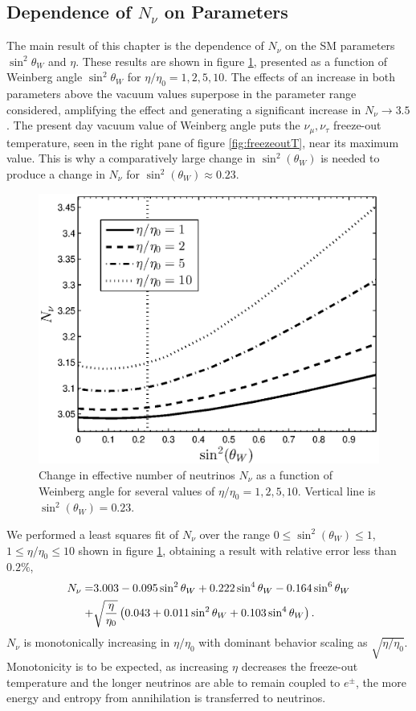 \subsection{Dependence of $N_\nu$ on Parameters}\label{sec:param_char}

The main result  of this chapter is the  dependence of $N_\nu$ on  the SM parameters   $\sin^2\theta_W$ and $\eta$. These results are shown in  figure \ref{N_nu_params}, presented as a function of  Weinberg angle $\sin^2 \theta_W $ for $\eta/\eta_0=1,2,5,10$. The effects of an increase in both parameters above the vacuum values superpose  in the parameter range  considered, amplifying the effect and generating a significant increase in  $N_\nu\to 3.5$. The present day vacuum value of Weinberg angle puts the $\nu_\mu,\nu_\tau$ freeze-out temperature, seen in the right pane of figure \ref{fig:freezeoutT},  near its maximum value.  This is why a comparatively large change in $\sin^2(\theta_W)$ is needed to produce a change in $N_\nu$ for $\sin^2(\theta_W)\approx0.23$.
 
\begin{figure}%
\centerline{\includegraphics[width=0.70\columnwidth]{03-birrell/ParametricStudies/N_eff2.eps}
}
\caption{Change in effective number of neutrinos  $N_\nu$ as a function of Weinberg angle for  several values of $\eta/\eta_0=1,2,5,10$. Vertical line is $\sin^2(\theta_W)=0.23$.}
\label{N_nu_params}  
 \end{figure}
We performed a least squares fit of $N_\nu$ over the range $0\leq \sin^2(\theta_W)\leq 1$, $1\leq \eta/\eta_0\leq 10$ shown in figure \ref{N_nu_params}, obtaining a result with relative error less than $0.2\%$,
\begin{align}
N_\nu=&3.003-0.095\sin^2\theta_W +0.222\sin^4\theta_W  -0.164\sin^6\theta_W \notag\\
+&\sqrt{\frac{\eta}{\eta_0}}\left(0.043+0.011\sin^2\theta_W +0.103\sin^4\theta_W\right).
\end{align}
$N_\nu$ is monotonically increasing in $\eta/\eta_0$ with dominant behavior  scaling as $\sqrt{ \eta/\eta_0}$. Monotonicity is to be expected, as increasing $\eta$ decreases the freeze-out temperature and the longer neutrinos are able to remain coupled to $e^\pm$, the more energy and entropy from annihilation is transferred to neutrinos.

